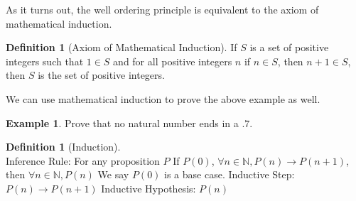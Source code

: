 \documentclass[letterpaper,10pt]{article}
\theoremstyle{plain}
\theoremstyle{definition}
\newtheorem{defn}[thm]{Definition}
\newtheorem{exmp}[thm]{Example}
\theoremstyle{remark}
\begin{document}
As it turns out, the well ordering principle is equivalent to the axiom of mathematical induction.

\begin{defn}[Axiom of Mathematical Induction]
If $S$ is a set of positive integers such that $1 \in S$ and
for all positive integers $n$ if $n \in S$, then $n + 1 \in S$, then $S$ is the set of positive integers.
\end{defn}
We can use mathematical induction to prove the above example as well.
\begin{exmp} Prove that no natural number ends in a $.7$.
\vspace{3cm}
\end{exmp}



\begin{defn}[Induction] $ $\\
Inference Rule:
\newline
For any proposition $P$
\newline
If $P(0)$, $\forall n \in \mathbb{N},P(n) \to P(n+1)$, then $\forall n \in \mathbb{N}, P(n)$
\newline
We say $P(0)$ is a base case.
\newline
Inductive Step: $P(n) \to P(n+1)$
\newline
Inductive Hypothesis: $P(n)$
\end{defn}
\end{document}
